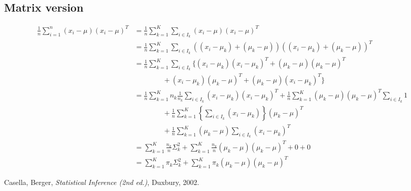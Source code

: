 \documentclass[12pt]{amsart}
\begin{document}
\subsection{Matrix version}
\begin{align*}
    \frac1{n}\sum_{i=1}^n (x_i - \mu)(x_i - \mu)^T &=
    \frac1{n}\sum_{k=1}^K \sum_{i\in I_k}(x_i - \mu)(x_i - \mu)^T\\
    &= \frac1{n}\sum_{k=1}^K \sum_{i\in I_k}((x_i - \mu_k) + (\mu_k - \mu))((x_i - \mu_k) + (\mu_k - \mu))^T\\
    &= \frac1{n}\sum_{k=1}^K \sum_{i\in I_k}
    \big\{(x_i - \mu_k)(x_i - \mu_k)^T + (\mu_k - \mu)(\mu_k - \mu)^T\\
    &\qquad\qquad+ (x_i - \mu_k)(\mu_k - \mu)^T + (\mu_k - \mu)(x_i - \mu_k)^T\big\}\\
    &= \frac1{n}\sum_{k=1}^K n_k\frac1{n_k}\sum_{i\in I_k}(x_i - \mu_k)(x_i - \mu_k)^T
    + \frac1{n}\sum_{k=1}^K(\mu_k - \mu)(\mu_k - \mu)^T\sum_{i\in I_k}1\\
    &\qquad\qquad + \frac1{n}\sum_{k=1}^K \left\{\sum_{i\in I_k}(x_i - \mu_k)\right\}(\mu_k - \mu)^T\\
    &\qquad\qquad+ \frac1{n}\sum_{k=1}^K (\mu_k - \mu)\sum_{i\in I_k}(x_i - \mu_k)^T\\
    &= \sum_{k=1}^K \frac{n_k}n \Sigma_k^2 + \sum_{k=1}^K \frac{n_k}n (\mu_k - \mu)(\mu_k - \mu)^T + 0 + 0\\
    &= \sum_{k=1}^K \pi_k \Sigma_k^2 + \sum_{k=1}^K \pi_k (\mu_k - \mu)(\mu_k - \mu)^T
\end{align*}




    \begin{thebibliography}{99}
        Casella, Berger, \emph{Statistical Inference (2nd ed.)}, Duxbury, 2002.
    \end{thebibliography}
\end{document}
